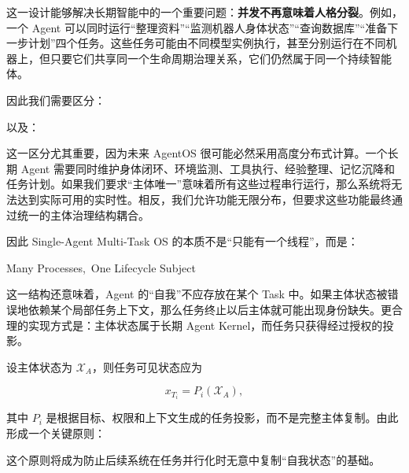 这一设计能够解决长期智能中的一个重要问题：\textbf{并发不再意味着人格分裂}。例如，一个 Agent 可以同时运行“整理资料”“监测机器人身体状态”“查询数据库”“准备下一步计划”四个任务。这些任务可能由不同模型实例执行，甚至分别运行在不同机器上，但只要它们共享同一个生命周期治理关系，它们仍然属于同一个持续智能体。

因此我们需要区分：

\begin{statementbox}
\centering
{}
\end{statementbox}

以及：

\begin{statementbox}
\centering
{}
\end{statementbox}

这一区分尤其重要，因为未来 AgentOS 很可能必然采用高度分布式计算。一个长期 Agent 需要同时维护身体闭环、环境监测、工具执行、经验整理、记忆沉降和任务计划。如果我们要求“主体唯一”意味着所有这些过程串行运行，那么系统将无法达到实际可用的实时性。相反，我们允许功能无限分布，但要求这些功能最终通过统一的主体治理结构耦合。

因此 Single-Agent Multi-Task OS 的本质不是“只能有一个线程”，而是：

\begin{statementbox}
Many Processes,\ One Lifecycle Subject
\end{statementbox}

这一结构还意味着，Agent 的“自我”不应存放在某个 Task 中。如果主体状态被错误地依赖某个局部任务上下文，那么任务终止以后主体就可能出现身份缺失。更合理的实现方式是：主体状态属于长期 Agent Kernel，而任务只获得经过授权的投影。

设主体状态为 $\mathcal{X}_A$，则任务可见状态应为

\[
x_{T_i}
=
P_i(
\mathcal{X}_A
),
\]

其中 $P_i$ 是根据目标、权限和上下文生成的任务投影，而不是完整主体复制。由此形成一个关键原则：

\begin{statementbox}
\centering
{}
\end{statementbox}

这个原则将成为防止后续系统在任务并行化时无意中复制“自我状态”的基础。

